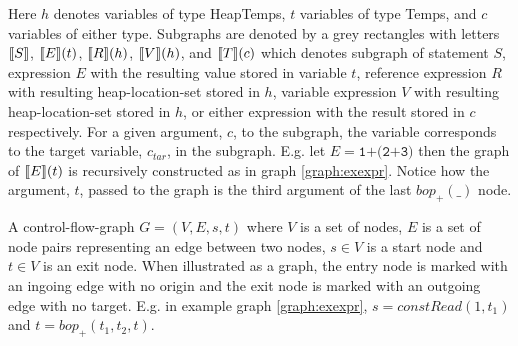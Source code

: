 Here $h$ denotes variables of type HeapTemps, $t$ variables of type Temps, and $c$ variables of either type. Subgraphs are denoted by a grey rectangles with letters $\llbracket S\rrbracket$, $\llbracket E\rrbracket(t)$, $\llbracket R\rrbracket(h)$, $\llbracket V\rrbracket(h)$, and $\llbracket T\rrbracket(c)$ which denotes subgraph of statement $S$, expression $E$ with the resulting value stored in variable $t$, reference expression $R$ with resulting heap-location-set stored in $h$, variable expression $V$ with resulting heap-location-set stored in $h$, or either expression with the result stored in $c$ respectively. For a given argument, $c$, to the subgraph, the variable corresponds to the target variable, $c_{tar}$, in the subgraph. E.g. let  $E = \texttt{1+(2+3)}$ then the graph of $\llbracket E\rrbracket(t)$ is recursively constructed as in graph \ref{graph:exexpr}. Notice how the argument, $t$, passed to the graph is the third argument of the last $\mathit{bop}_+(\_)$ node.
\begin{definition}
\label{def:cfg}
A control-flow-graph $G = (V,E, s, t)$ where $V$ is a set of nodes, $E$ is a set of node pairs representing an edge between two nodes, $s\in V$ is a start node and $t\in V$ is an exit node. When illustrated as a graph, the entry node is marked with an ingoing edge with no origin and the exit node is marked with an outgoing edge with no target. E.g. in example graph \ref{graph:exexpr}, $s = \mathit{constRead}(1, t_1)$ and $t = \mathit{bop}_+(t_1, t_2, t)$.
\end{definition}

